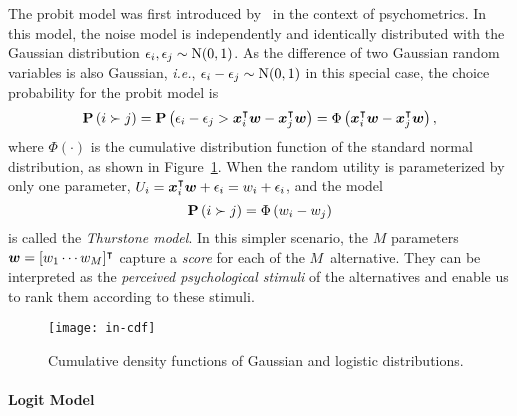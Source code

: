 The probit model was first introduced by~\citet{thurstone1927law} in the context of psychometrics.
In this model, the noise model is independently and identically distributed with the Gaussian distribution $\epsilon_i, \epsilon_j \sim \mathrm{N}( 0, 1 )$.
As the difference of two Gaussian random variables is also Gaussian, \textit{i.e.}, $\epsilon_i - \epsilon_j \sim \mathrm{N}( 0, 1 )$ in this special case, the choice probability for the probit model is
\begin{equation*}
	\mathbf{P}\left( i \succ j \right) = \mathbf{P}\left( \epsilon_i - \epsilon_j > \bm{x}_i^\intercal \bm{w} - \bm{x}_j^\intercal \bm{w} \right) = \Phi \left( \bm{x}_i^\intercal \bm{w} - \bm{x}_j^\intercal \bm{w} \right),
\end{equation*}
where $\Phi( \cdot )$ is the cumulative distribution function of the standard normal distribution, as shown in Figure~\ref{in:fig:cdf}.
When the random utility is parameterized by only one parameter, $U_i = \bm{x}_i^\intercal \bm{w} + \epsilon_i = w_i + \epsilon_i$, and the model
\begin{equation*}
	\mathbf{P}\left( i \succ j \right) = \Phi \left( w_i - w_j \right)
\end{equation*}
is called the \emph{Thurstone model}.
In this simpler scenario, the $M$ parameters~$\bm{w} = [w_1 \cdots w_M]^\intercal$ capture a \emph{score} for each of the $M$~alternative.
They can be interpreted as the \emph{perceived psychological stimuli} of the alternatives and enable us to rank them according to these stimuli.

\begin{figure}
	\centering
	\texttt{[image: in-cdf]}
	\caption{Cumulative density functions of Gaussian and logistic distributions.}
	\label{in:fig:cdf}
\end{figure}

\paragraph{Logit Model}


